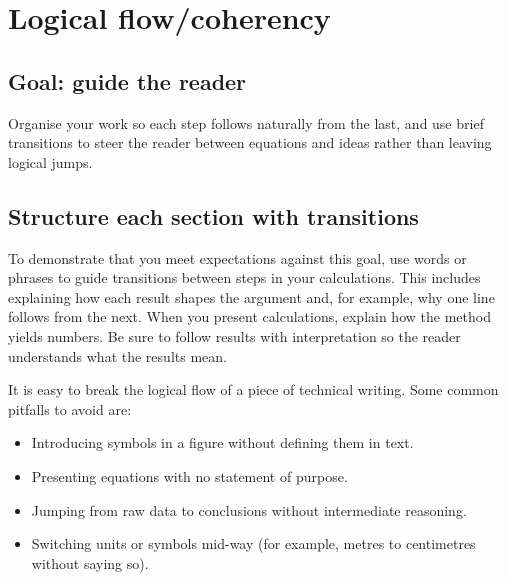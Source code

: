 \documentclass[
  a4paper,
  DIV=11,
  numbers=noendperiod,
  oneside]{scrreprt}
\providecommand{\tightlist}{%
  \setlength{\itemsep}{0pt}\setlength{\parskip}{0pt}}
\begin{document}
\section{Logical flow/coherency}\label{sec-writing-coherency}

\subsection{Goal: guide the reader}\label{goal-guide-the-reader}

Organise your work so each step follows naturally from the last, and use
brief transitions to steer the reader between equations and ideas rather
than leaving logical jumps.

\subsection{Structure each section with
transitions}\label{structure-each-section-with-transitions}

To demonstrate that you meet expectations against this goal, use words
or phrases to guide transitions between steps in your calculations. This
includes explaining how each result shapes the argument and, for
example, why one line follows from the next. When you present
calculations, explain how the method yields numbers. Be sure to follow
results with interpretation so the reader understands what the results
mean.

\begin{tcolorbox}[enhanced jigsaw, colframe=quarto-callout-warning-color-frame, title=\textcolor{quarto-callout-warning-color}{\faExclamationTriangle}\hspace{0.5em}{Avoid common flow breakers}, breakable, opacityback=0, titlerule=0mm, colbacktitle=quarto-callout-warning-color!10!white, toptitle=1mm, colback=white, coltitle=black, toprule=.15mm, bottomtitle=1mm, left=2mm, arc=.35mm, rightrule=.15mm, bottomrule=.15mm, opacitybacktitle=0.6, leftrule=.75mm]

It is easy to break the logical flow of a piece of technical writing.
Some common pitfalls to avoid are:

\begin{itemize}
\tightlist
\item
  Introducing symbols in a figure without defining them in text.
\item
  Presenting equations with no statement of purpose.
\item
  Jumping from raw data to conclusions without intermediate reasoning.
\item
  Switching units or symbols mid-way (for example, metres to centimetres
  without saying so).
\end{itemize}

\end{tcolorbox}
\end{document}
